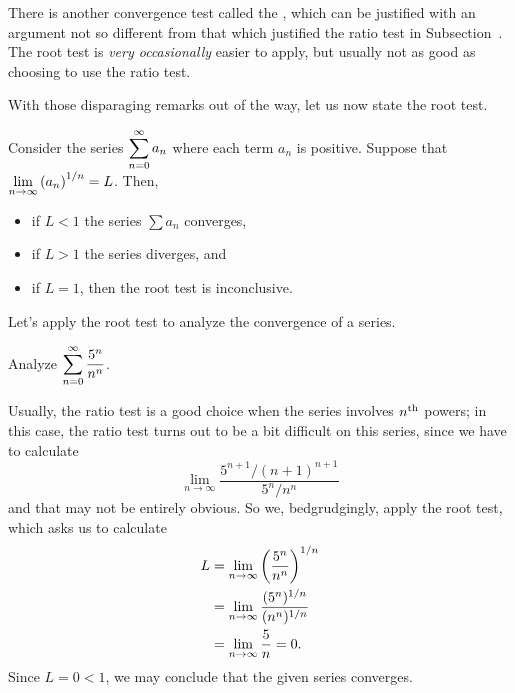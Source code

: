There is another convergence test called the ,
which can be justified with an argument not so
different from that which justified the ratio test in
Subsection~.  The root test is
\textit{very occasionally} easier to apply, but usually not as good as
choosing to use the ratio test.

With those disparaging remarks out of the way, let us now state the
root test.

\begin{theorem} \label{thm:root test}
Consider the series $\displaystyle\sum_{n=0}^\infty a_n$ where each term $a_n$ is positive.
Suppose that $\displaystyle\lim_{n\to \infty} \left(a_n\right)^{1/n}=L$.  Then,
\begin{itemize}
\item if $L<1$ the series $\sum a_n$ converges, 
\item if $L>1$ the series diverges, and
\item if $L=1$, then the root test is inconclusive.
\end{itemize}
\end{theorem}

Let's apply the root test to analyze the convergence of a series.

\begin{example} Analyze $\displaystyle\sum_{n=0}^\infty {5^n\over n^n}$.
\end{example}

\begin{solution}
  Usually, the ratio test is a good choice when the series involves
  $n^{\mbox{\scriptsize th}}$ powers; in this case, the ratio test
  turns out to be a bit difficult on this series, since we have to
  calculate
  $$
  \lim_{n \to \infty} \frac{5^{n+1} / (n+1)^{n+1}}{5^n / n^n}
  $$
  and that may not be entirely obvious.  So we, bedgrudgingly, apply
  the root test, which asks us to calculate
\begin{align*}
  L &= \lim_{n\to\infty} \left({5^n\over n^n}\right)^{1/n} \\
  &= \lim_{n\to\infty} {(5^n)^{1/n}\over (n^n)^{1/n}} \\
  &= \lim_{n\to\infty} {5\over n}=0.
\end{align*}
  Since $L = 0<1$, we may conclude that the given series converges.
\end{solution}

